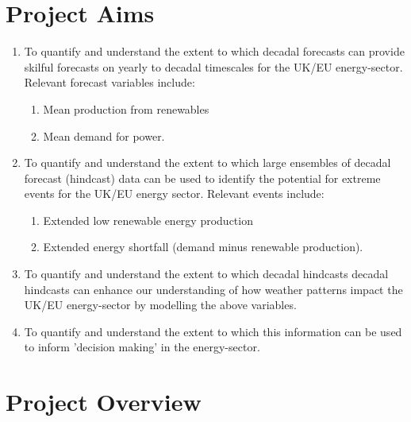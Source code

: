 \documentclass{article}
\begin{document}
\section*{Project Aims}

\begin{enumerate}
    \item To quantify and understand the extent to which decadal forecasts can provide skilful forecasts on yearly to decadal timescales for the UK/EU energy-sector. Relevant forecast variables include:
    \begin{enumerate}
        \item Mean production from renewables
        \item Mean demand for power.
    \end{enumerate}
    \item To quantify and understand the extent to which large ensembles of decadal forecast (hindcast) data can be used to identify the potential for extreme events for the UK/EU energy sector. Relevant events include:
    \begin{enumerate}
        \item Extended low renewable energy production
        \item Extended energy shortfall (demand minus renewable production).
    \end{enumerate}
    \item To quantify and understand the extent to which decadal hindcasts decadal hindcasts can enhance our understanding of how weather patterns impact the UK/EU energy-sector by modelling the above variables.
    \item To quantify and understand the extent to which this information can be used to inform 'decision making' in the energy-sector.
\end{enumerate}

\section*{Project Overview}
\end{document}
